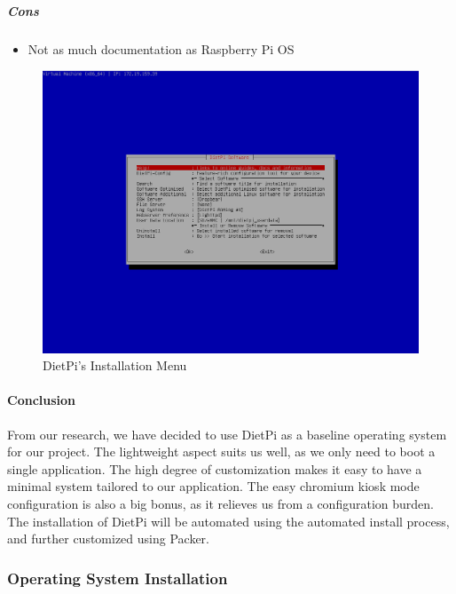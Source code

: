 \subparagraph{Cons}
\begin{itemize}
  \item Not as much documentation as Raspberry Pi OS
\end{itemize}

\begin{figure}[h!]
  \centering
  \includegraphics[width=\linewidth]{image/dietpi-config.png}
  \caption{DietPi's Installation Menu}
  \label{fig:dietpi}
\end{figure}

\paragraph{Conclusion}

From our research, we have decided to use DietPi as a baseline operating system for our
project. The lightweight aspect suits us well, as we only need to boot a single
application. The high degree of customization makes it easy to have a minimal system
tailored to our application. The easy chromium kiosk mode configuration is also a big
bonus, as it relieves us from a configuration burden. The installation of DietPi will be
automated using the automated install process, and further customized using Packer.

\subsubsection{Operating System Installation}

